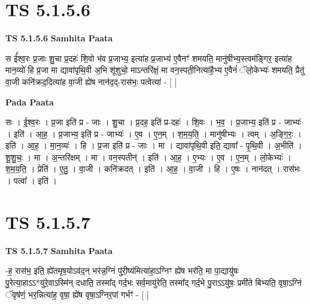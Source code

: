 \documentclass[17pt]{extarticle}
\begin{document}

\section{ TS 5.1.5.6 }

\textbf{TS 5.1.5.6 } \newline
\textbf{Samhita Paata} \newline

स ई᳚श्व॒रः प्र॒जाः शु॒चा प्र॒दहः॑ शि॒वो भ॑व प्र॒जाभ्य॒ इत्या॑ह प्र॒जाभ्य॑ ए॒वैनꣳ॑ शमयति॒ मानु॑षीभ्य॒स्त्वम॑ङ्गिर॒ इत्या॑ह मान॒व्यो॑ हि प्र॒जा मा द्यावा॑पृथि॒वी अ॒भि शू॑शुचो॒ माऽन्तरि॑क्षं॒ मा वन॒स्पती॒नित्या॑है॒भ्य ए॒वैनं॑ ॅलो॒केभ्यः॑ शमयति॒ प्रैतु॑ वा॒जी कनि॑क्रद॒दित्या॑ह वा॒जी ह्ये॑ष नान॑द॒द्-रास॑भः॒ पत्वेत्या॑ - [  ] \newline

\textbf{Pada Paata} \newline

सः । ई॒श्व॒रः । प्र॒जा इति॑ प्र - जाः । शु॒चा । प्र॒दह॒ इति॑ प्र-दहः॑ । शि॒वः । भ॒व॒ । प्र॒जाभ्य॒ इति॑ प्र - जाभ्यः॑ । इति॑ । आ॒ह॒ । प्र॒जाभ्य॒ इति॑ प्र - जाभ्यः॑ । ए॒व । ए॒न॒म् । श॒म॒य॒ति॒ । मानु॑षीभ्यः । त्वम् । अ॒ङ्गि॒रः॒ । इति॑ । आ॒ह॒ । मा॒न॒व्यः॑ । हि । प्र॒जा इति॑ प्र - जाः । मा । द्यावा॑पृथि॒वी इति॒ द्यावा᳚ - पृ॒थि॒वी । अ॒भीति॑ । शू॒शु॒चः॒ । मा । अ॒न्तरि॑क्षम् । मा । वन॒स्पतीन्॑ । इति॑ । आ॒ह॒ । ए॒भ्यः । ए॒व । ए॒न॒म् । लो॒केभ्यः॑ । श॒म॒य॒ति॒ । प्रेति॑ । ए॒तु॒ । वा॒जी । कनि॑क्रदत् । इति॑ । आ॒ह॒ । वा॒जी । हि । ए॒षः । नान॑दत् । रास॑भः । पत्वा᳚ । इति॑ ।  \newline





\section{ TS 5.1.5.7 }

\textbf{TS 5.1.5.7 } \newline
\textbf{Samhita Paata} \newline

-ह॒ रास॑भ॒ इति॒ ह्ये॑तमृष॒योऽव॑द॒न् भर॑न्न॒ग्निं पु॑री॒ष्य॑मित्या॑हा॒ऽग्निꣳ ह्ये॑ष भर॑ति॒ मा पा॒द्यायु॑षः पु॒रेत्या॒हाऽऽ*यु॑रे॒वाऽस्मि॑न् दधाति॒ तस्मा᳚द् गर्द॒भः सर्व॒मायु॑रेति॒ तस्मा᳚द् गर्द॒भे पु॒राऽऽयु॑षः॒ प्रमी॑ते बिभ्यति॒ वृषा॒ऽग्निं ॅवृष॑णं॒ भर॒न्नित्या॑ह॒ वृषा॒ ह्ये॑ष वृषा॒ऽग्निर॒पां गर्भꣳ॑ - [  ] \newline
\end{document}
